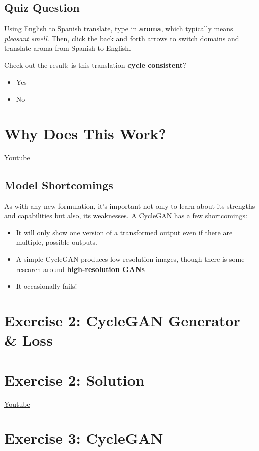 \subsection{Quiz Question}
Using English to Spanish translate, type in \textbf{aroma}, which typically means \textit{pleasant smell}. Then, click the back and forth arrows to switch domains and translate aroma from Spanish to English.\newline

Check out the result; is this translation \textbf{cycle consistent}?
\begin{itemize}
    \item Yes
    \item No
\end{itemize}

\section{Why Does This Work?}
\href{https://www.youtube.com/watch?v=q7SP89u02L0&t=1s}{Youtube}
\subsection{Model Shortcomings}
As with any new formulation, it's important not only to learn about its strengths and capabilities but also, its weaknesses. A CycleGAN has a few shortcomings:
\begin{itemize}
    \item It will only show one version of a transformed output even if there are multiple, possible outputs.
    \item A simple CycleGAN produces low-resolution images, though there is some research around \href{https://github.com/NVIDIA/pix2pixHD}{\textbf{high-resolution GANs}}
    \item It occasionally fails!
\end{itemize}

\section{Exercise 2: CycleGAN Generator \& Loss}


\section{Exercise 2: Solution}
\href{https://www.youtube.com/watch?v=rJh4rFyMr00}{Youtube}


\section{Exercise 3: CycleGAN}

